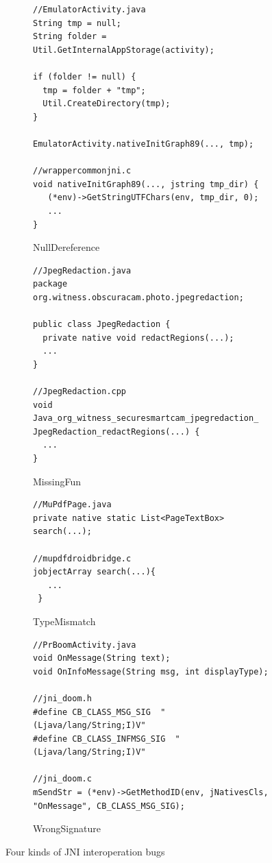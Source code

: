 \begin{figure}[t]
  \centering
  \vspace{2mm}
  \begin{subfigure}[t]{0.5\textwidth}
    \begin{lstlisting}[style=cpp,xleftmargin=2.5em]
//EmulatorActivity.java
String tmp = null;
String folder = Util.GetInternalAppStorage(activity);

if (folder != null) {
  tmp = folder + "tmp";
  Util.CreateDirectory(tmp);
}

EmulatorActivity.nativeInitGraph89(..., tmp);

//wrappercommonjni.c
void nativeInitGraph89(..., jstring tmp_dir) {
   (*env)->GetStringUTFChars(env, tmp_dir, 0);
   ...
}
    \end{lstlisting}
    \vspace*{-.5em}
    \caption{NullDereference}
    \label{fig:bug1}
  \end{subfigure}
  \begin{subfigure}[t]{0.5\textwidth}
    \begin{lstlisting}[style=cpp,xleftmargin=2.5em]
//JpegRedaction.java
package org.witness.obscuracam.photo.jpegredaction;

public class JpegRedaction {
  private native void redactRegions(...);
  ...
}

//JpegRedaction.cpp
void
Java_org_witness_securesmartcam_jpegredaction_ JpegRedaction_redactRegions(...) {
  ...
}
    \end{lstlisting}
    \vspace*{-.5em}
    \caption{MissingFun}
    \label{fig:bug2}
  \end{subfigure}
  \begin{subfigure}[t]{0.5\textwidth}
    \begin{lstlisting}[style=cpp,xleftmargin=2.5em]
//MuPdfPage.java
private native static List<PageTextBox> search(...);

//mupdfdroidbridge.c
jobjectArray search(...){
   ...
 }
    \end{lstlisting}
    \vspace*{-.5em}
    \caption{TypeMismatch}
    \label{fig:bug3}
  \end{subfigure}
  \begin{subfigure}[t]{0.5\textwidth}
    \begin{lstlisting}[style=cpp,xleftmargin=2.5em]
//PrBoomActivity.java
void OnMessage(String text);
void OnInfoMessage(String msg, int displayType);

//jni_doom.h
#define CB_CLASS_MSG_SIG  "(Ljava/lang/String;I)V"
#define CB_CLASS_INFMSG_SIG  "(Ljava/lang/String;I)V"

//jni_doom.c
mSendStr = (*env)->GetMethodID(env, jNativesCls, "OnMessage", CB_CLASS_MSG_SIG);

    \end{lstlisting}
    \vspace*{-.5em}
    \caption{WrongSignature}
    \label{fig:bug3}
  \end{subfigure}
  \vspace*{-.5em}
  \caption{Four kinds of JNI interoperation bugs}
  \label{fig:bugs}
\end{figure}

